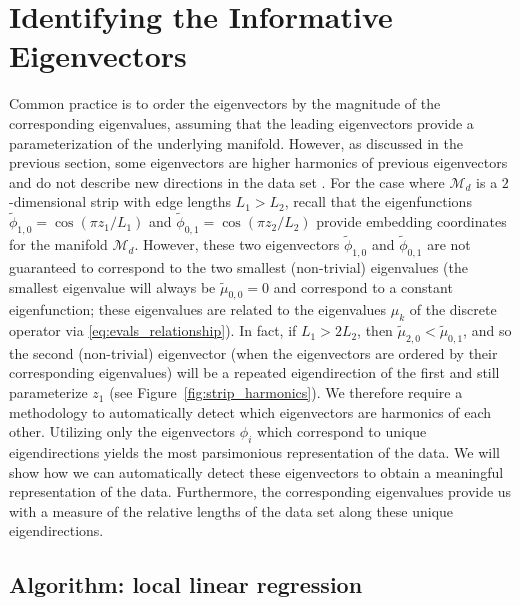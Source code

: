 \documentclass[3p]{elsarticle}
\begin{document}
\section{Identifying the Informative Eigenvectors }

Common practice is to order the eigenvectors by the magnitude of the corresponding eigenvalues, assuming that the leading eigenvectors provide a parameterization of the underlying manifold.
%
However, as discussed in the previous section, some eigenvectors are higher harmonics of previous eigenvectors and do not describe new directions in the data set \cite{gerber2007robust}.
%
For the case where $\mathcal{M}_d$ is a $2$-dimensional strip with edge lengths $L_1  > L_2$, recall that the eigenfunctions $\tilde{\phi}_{1,0} = \cos \left(  {\pi z_1}/{L_1} \right)$ and  $\tilde{\phi}_{0,1} = \cos \left(  {\pi z_2}/{L_2} \right)$ provide embedding coordinates for the manifold $\mathcal{M}_d$. 
%
However, these two eigenvectors $\tilde{\phi}_{1, 0}$ and $\tilde{\phi}_{0, 1}$ are not guaranteed to correspond to the two smallest (non-trivial) eigenvalues (the smallest eigenvalue will always be $\tilde{\mu}_{0,0} = 0$ and correspond to a constant eigenfunction; these eigenvalues are related to the eigenvalues $\mu_k$ of the discrete operator via \eqref{eq:evals_relationship}). 
%
In fact, if $L_1 > 2 L_2$, then $\tilde{\mu}_{2, 0} < \tilde{\mu}_{0, 1}$, and so the second (non-trivial) eigenvector (when the eigenvectors are ordered by their corresponding eigenvalues) will be a repeated eigendirection of the first and still parameterize $z_1$ (see Figure~\ref{fig:strip_harmonics}).
%
We therefore require a methodology to automatically detect which eigenvectors are harmonics of each other. 
%
Utilizing only the eigenvectors $\phi_i$ which correspond to unique eigendirections yields the most parsimonious representation of the data.
%
We will show how we can automatically detect these eigenvectors to obtain a meaningful representation of the data.
%
Furthermore, the corresponding eigenvalues provide us with a measure of the relative lengths of the data set along these unique eigendirections. 


\subsection{Algorithm: local linear regression}
\end{document}
